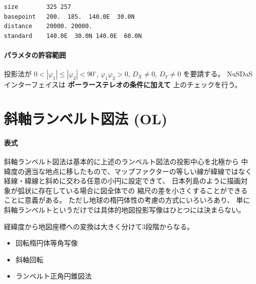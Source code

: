 \begin{screen}
\begin{verbatim}
size        325 257
basepoint   200.  185.  140.0E  30.0N
distance    20000. 20000.
standard    140.0E  30.0N 140.0E  60.0N
\end{verbatim}
\end{screen}

\paragraph{パラメタの許容範囲}
投影法が
\(0 < |\varphi_1| \le |\varphi_2| < 90^\circ\),
\(\varphi_1\varphi_2 > 0\),
\(D_X \ne 0\),
\(D_Y \ne 0\)
を要請する。
NuSDaS インターフェイスは
{\bf ポーラーステレオの条件に加えて}
上のチェックを行う。

\section{斜軸ランベルト図法 (OL)}
\label{sec:proj:OL}

\paragraph{表式}
斜軸ランベルト図法は基本的に上述のランベルト図法の投影中心を北極から
中緯度の適当な地点に移したもので、マップファクターの等しい線が緯線ではなく
経線・緯線と斜めに交わる任意の小円に設定できて、
日本列島のように描画対象が弧状に存在している場合に図全体での
縮尺の差を小さくすることができることに意義がある。
ただし地球の楕円体性の考慮の方式にいろいろあり、
単に斜軸ランベルトというだけでは具体的地図投影写像はひとつには決まらない。

経緯度から地図座標への変換は大きく分けて3段階からなる。
\begin{itemize}
\item
	回転楕円体等角写像
\item
	斜軸回転
\item
	ランベルト正角円錐図法
\end{itemize}

